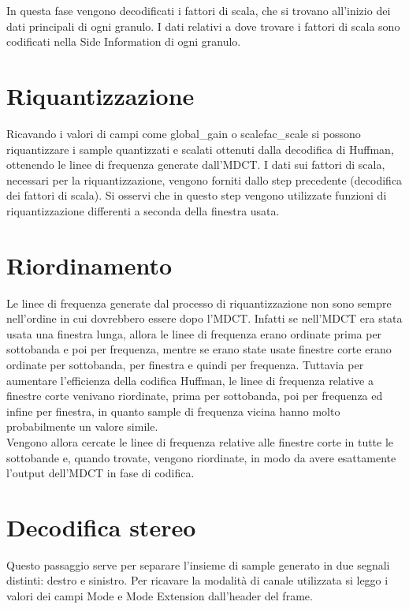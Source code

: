 		In questa fase vengono decodificati i fattori di scala, che si trovano all'inizio dei dati principali di ogni granulo. I dati relativi a dove trovare i fattori di scala sono codificati nella Side Information di ogni granulo.
		
	\section{Riquantizzazione} \label{sec:riquantizzazione}
		
		Ricavando i valori di campi come global\_gain o scalefac\_scale si possono riquantizzare i sample quantizzati e scalati ottenuti dalla decodifica di Huffman, ottenendo le linee di frequenza generate dall'MDCT. I dati sui fattori di scala, necessari per la riquantizzazione, vengono forniti dallo step precedente (decodifica dei fattori di scala). Si osservi che in questo step vengono utilizzate funzioni di riquantizzazione differenti a seconda della finestra usata.
		
	\section{Riordinamento} \label{sec:riordinamento}
		
		Le linee di frequenza generate dal processo di riquantizzazione non sono sempre nell'ordine in cui dovrebbero essere dopo l'MDCT. Infatti se nell'MDCT era stata usata una finestra lunga, allora le linee di frequenza erano ordinate prima per sottobanda e poi per frequenza, mentre se erano state usate finestre corte erano ordinate per sottobanda, per finestra e quindi per frequenza. Tuttavia per aumentare l'efficienza della codifica Huffman, le linee di frequenza relative a finestre corte venivano riordinate, prima per sottobanda, poi per frequenza ed infine per finestra, in quanto sample di frequenza vicina hanno molto probabilmente un valore simile.\\
		Vengono allora cercate le linee di frequenza relative alle finestre corte in tutte le sottobande e, quando trovate, vengono riordinate, in modo da avere esattamente l'output dell'MDCT in fase di codifica.
		
	\section{Decodifica stereo} \label{sec:decodifica_stereo}
		
		Questo passaggio serve per separare l'insieme di sample generato in due segnali distinti: destro e sinistro. Per ricavare la modalità di canale utilizzata si leggo i valori dei campi Mode e Mode Extension dall'header del frame.
		
